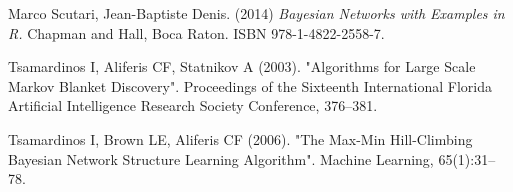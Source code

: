 \documentclass[a4paper,11pt]{article}
\begin{document}
\begin{thebibliography}{}
Marco Scutari, Jean-Baptiste Denis. (2014) \textit{Bayesian Networks with Examples in R.} Chapman and Hall, Boca Raton. ISBN 978-1-4822-2558-7.

Tsamardinos I, Aliferis CF, Statnikov A (2003). "Algorithms for Large Scale Markov Blanket Discovery". Proceedings of the Sixteenth International Florida Artificial Intelligence Research Society Conference, 376–381.

Tsamardinos I, Brown LE, Aliferis CF (2006). "The Max-Min Hill-Climbing Bayesian Network Structure Learning Algorithm". Machine Learning, 65(1):31–78.

\end{thebibliography}
\end{document}
